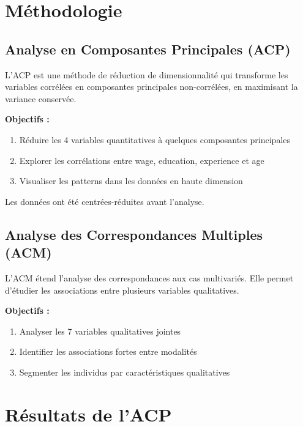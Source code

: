 \documentclass[12pt,a4paper]{report}
\begin{document}
\section{Méthodologie}

\subsection{Analyse en Composantes Principales (ACP)}

L'ACP est une méthode de réduction de dimensionnalité qui transforme les variables corrélées en composantes principales non-corrélées, en maximisant la variance conservée.

\textbf{Objectifs :}
\begin{enumerate}
    \item Réduire les 4 variables quantitatives à quelques composantes principales
    \item Explorer les corrélations entre wage, education, experience et age
    \item Visualiser les patterns dans les données en haute dimension
\end{enumerate}

Les données ont été centrées-réduites avant l'analyse.

\subsection{Analyse des Correspondances Multiples (ACM)}

L'ACM étend l'analyse des correspondances aux cas multivariés. Elle permet d'étudier les associations entre plusieurs variables qualitatives.

\textbf{Objectifs :}
\begin{enumerate}
    \item Analyser les 7 variables qualitatives jointes
    \item Identifier les associations fortes entre modalités
    \item Segmenter les individus par caractéristiques qualitatives
\end{enumerate}

\section{Résultats de l'ACP}
\end{document}
